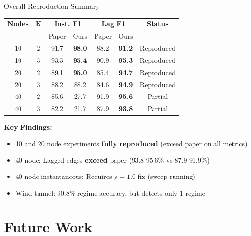 \documentclass[aspectratio=169]{beamer}
\begin{document}
\begin{frame}{Overall Reproduction Summary}
\begin{table}
\centering
\small
\begin{tabular}{c|c|cc|cc|c}
\toprule
\textbf{Nodes} & \textbf{K} & \multicolumn{2}{c|}{\textbf{Inst. F1}} & \multicolumn{2}{c|}{\textbf{Lag F1}} & \textbf{Status} \\
& & Paper & Ours & Paper & Ours & \\
\midrule
10 & 2 & 91.7 & \textcolor{reprogreen}{\textbf{98.0}} & 88.2 & \textcolor{reprogreen}{\textbf{91.2}} & \textcolor{reprogreen}{Reproduced} \\
10 & 3 & 93.3 & \textcolor{reprogreen}{\textbf{95.4}} & 90.9 & \textcolor{reprogreen}{\textbf{95.3}} & \textcolor{reprogreen}{Reproduced} \\
20 & 2 & 89.1 & \textcolor{reprogreen}{\textbf{95.0}} & 85.4 & \textcolor{reprogreen}{\textbf{94.7}} & \textcolor{reprogreen}{Reproduced} \\
20 & 3 & 88.2 & 88.2 & 84.6 & \textcolor{reprogreen}{\textbf{94.9}} & \textcolor{reprogreen}{Reproduced} \\
40 & 2 & 85.6 & \textcolor{warnred}{27.7} & 91.9 & \textcolor{reprogreen}{\textbf{95.6}} & \textcolor{warnred}{Partial} \\
40 & 3 & 82.2 & \textcolor{warnred}{21.7} & 87.9 & \textcolor{reprogreen}{\textbf{93.8}} & \textcolor{warnred}{Partial} \\
\bottomrule
\end{tabular}
\end{table}

\vspace{0.3cm}
\textbf{Key Findings:}
\begin{itemize}
    \item 10 and 20 node experiments \textbf{fully reproduced} (exceed paper on all metrics)
    \item 40-node: Lagged edges \textbf{exceed} paper (93.8-95.6\% vs 87.9-91.9\%)
    \item 40-node instantaneous: Requires $\rho=1.0$ fix (sweep running)
    \item Wind tunnel: 90.8\% regime accuracy, but detects only 1 regime
\end{itemize}
\end{frame}

\section{Future Work}
\end{document}
